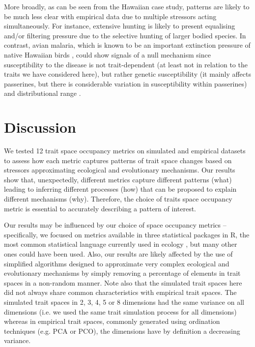 \documentclass[12pt,letterpaper]{article}
\begin{document}
More broadly, as can be seen from the Hawaiian case study, patterns are likely to be much less clear with empirical data due to multiple stressors acting simultaneously.
For instance, extensive hunting is likely to present equalising and/or filtering pressure due to the selective hunting of larger bodied species.
In contrast, avian malaria, which is known to be an important extinction pressure of native Hawaiian birds \cite{samuel2011dynamics}, could show signals of a null mechanism since susceptibility to the disease is not trait-dependent (at least not in relation to the traits we have considered here), but rather genetic susceptibility (it mainly affects passerines, but there is considerable variation in susceptibility within passerines) and distributional range \citep{jessup2023wildlife}.

\section{Discussion}

We tested 12 trait space occupancy metrics on simulated and empirical datasets to assess how each metric captures patterns of trait space changes based on stressors approximating ecological and evolutionary mechanisms.
Our results show that, unexpectedly, different metrics capture different patterns (what) leading to inferring different processes (how) that can be proposed to explain different mechanisms (why).
Therefore, the choice of traits space occupancy metric is essential to accurately describing a pattern of interest.

Our results may be influenced by our choice of space occupancy metrics – specifically, we focused on metrics available in three statistical packages in R, the most common statistical language currently used in ecology \citep{lai2019evaluating}, but many other ones could have been used.
Also, our results are likely affected by the use of simplified algorithms designed to approximate very complex ecological and evolutionary mechanisms by simply removing a percentage of elements in trait spaces in a non-random manner.
Note also that the simulated trait spaces here did not always share common characteristics with empirical trait spaces.
The simulated trait spaces in 2, 3, 4, 5 or 8 dimensions had the same variance on all dimensions (i.e.
we used the same trait simulation process for all dimensions) whereas in empirical trait spaces, commonly generated using ordination techniques (e.g.
PCA or PCO), the dimensions have by definition a decreasing variance.
\end{document}
